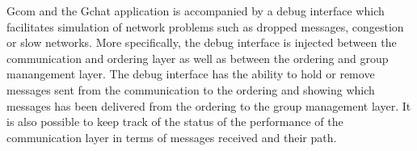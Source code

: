 
	Gcom and the Gchat application is accompanied by a debug interface which facilitates simulation of network problems such as dropped messages, congestion or slow networks.
	More specifically, the debug interface is injected between the communication and ordering layer as well as between the ordering and group manangement layer.
	The debug interface has the ability to hold or remove messages sent from the communication to the ordering and showing which messages has been delivered from the ordering to the group management layer.
	It is also possible to keep track of the status of the performance of the communication layer in terms of messages received and their path.
